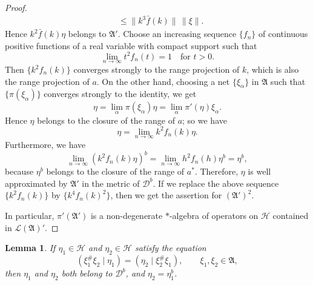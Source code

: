 \documentclass[12pt,b5paper,twoside]{article}
\theoremstyle{takesaki}
\newtheorem{lemma}{Lemma}[section]
\numberwithin{equation}{section}
\begin{document}
\begin{proof}
\begin{align*}
   &\leq \|k^3\bar f(k)\|\,\|\xi\|.
\end{align*}
Hence $k^2\bar f(k)\eta$ belongs to $\mathfrak A'$.  Choose an
increasing sequence $\{f_n\}$ of continuous positive functions of a
real variable with compact support such that
\[
 \lim_{n\to\infty}t^2f_n(t)=1\quad\text{for }t>0.
\]
Then $\{k^2f_n(k)\}$ converges strongly to the range projection of $k$,
which is also the range projection of $a$.  On the other hand, choosing
a net $\{\xi_\alpha\}$ in $\mathfrak A$ such that
$\{\pi(\xi_\alpha)\}$ converges strongly to the identity, we get
\[
 \eta=\lim_\alpha\pi(\xi_\alpha)\eta
     =\lim_\alpha\pi'(\eta)\xi_\alpha.
\]
Hence $\eta$ belongs to the closure of the range of $a$; so we have
\[
 \eta=\lim_{n\to\infty}k^2f_n(k)\eta.
\]
Furthermore, we have
\[
 \lim_{n\to\infty}(k^2f_n(k)\eta)^b
 =\lim_{n\to\infty}h^2f_n(h)\eta^b
 =\eta^b,
\]
because $\eta^b$ belongs to the closure of the range of $a^*$.
Therefore, $\eta$ is well approximated by $\mathfrak A'$ in the metric
of $\mathcal D^b$.  If we replace
the above sequence $\{k^2f_n(k)\}$ by $\{k^4f_n(k)^2\}$, then we get
the assertion for $(\mathfrak A')^2$.

In particular, $\pi'(\mathfrak A')$ is a non-degenerate $*$-algebra of
operators on $\mathcal H$ contained in $\mathcal L(\mathfrak A)'$.
\end{proof}

\begin{lemma}\label{lem:3.4}
If $\eta_1\in\mathcal H$ and $\eta_2\in\mathcal H$ satisfy the equation
\begin{equation}
 (\xi_1^\#\xi_2\mid\eta_1)
   =(\eta_2\mid\xi_2^\#\xi_1),
 \qquad \xi_1,\xi_2\in\mathfrak A,
 \tag{3.6}\label{eq:3.6}
\end{equation}
then $\eta_1$ and $\eta_2$ both belong to $\mathcal D^b$, and
$\eta_2=\eta_1^b$.
\end{lemma}
\end{document}
